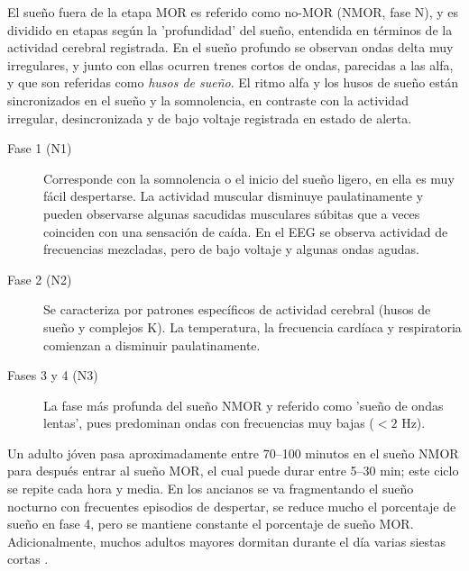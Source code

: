 \documentclass[12pt,a4paper]{mitthesis}
\begin{document}
El sue\~no fuera de la etapa MOR es referido como no-MOR (NMOR, fase N), y es dividido en etapas 
seg\'un la 'profundidad' del sue\~no, entendida en t\'erminos de la actividad cerebral registrada.
En el sue\~no profundo se observan ondas delta muy irregulares, y junto con ellas ocurren trenes 
cortos de ondas, parecidas a las alfa, y que son referidas como \textit{husos de sue\~no}. 
El ritmo alfa y los husos de sue\~no est\'an sincronizados en el sue\~no y la somnolencia, en 
contraste con la actividad irregular, desincronizada y de bajo voltaje registrada en estado de 
alerta.

\begin{description}
\item[Fase 1 (N1)] Corresponde con la somnolencia o el inicio del sue\~no ligero, en ella es muy 
f\'acil despertarse. La actividad muscular disminuye paulatinamente y pueden observarse algunas 
sacudidas musculares s\'ubitas que a veces coinciden con una sensación de ca\'ida. 
En el EEG se observa actividad de frecuencias mezcladas, pero de bajo voltaje y algunas ondas 
agudas. 

\item[Fase 2 (N2)] Se caracteriza por patrones espec\'ificos de actividad cerebral (husos de 
sue\~no y complejos K). La temperatura, la frecuencia card\'iaca y respiratoria comienzan a 
disminuir paulatinamente. 

\item[Fases 3 y 4 (N3)] La fase m\'as profunda del sue\~no NMOR y referido como 'sue\~no de ondas 
lentas', pues predominan ondas con frecuencias muy bajas ($<2$ Hz).
\end{description}

Un adulto j\'oven pasa aproximadamente entre 70--100 minutos en el sue\~no NMOR para despu\'es 
entrar al sue\~no MOR, el cual puede durar entre 5--30 min; este ciclo se repite cada hora y media.
En los ancianos se va fragmentando el sue\~no nocturno con frecuentes episodios de despertar, se 
reduce mucho el porcentaje de sue\~no en fase 4, pero se mantiene constante el porcentaje de 
sue\~no MOR. Adicionalmente, muchos adultos mayores dormitan durante el d\'ia varias siestas 
cortas \cite{CarrilloMora}.

\end{document}
